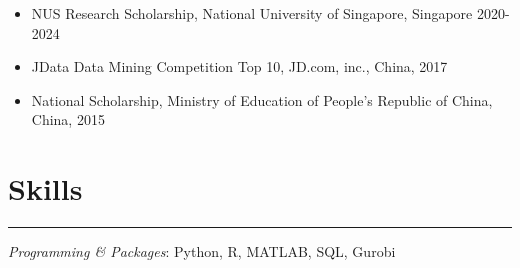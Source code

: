 \documentclass[12pt, a4paper]{article}
\begin{document}
{\begin{itemize}[leftmargin=26pt, itemsep=1pt, parsep=0.5pt, topsep=1pt]
	\item NUS Research Scholarship, National University of Singapore, Singapore \hfill 2020-2024
	
	\item JData Data Mining Competition Top 10, JD.com, inc., China, 2017

	\item National Scholarship, Ministry of Education of People’s Republic of China, China, 2015


\end{itemize}




\section*{Skills}
\vspace*{0.4em}
\hrule height 0.5pt

\textit{Programming \& Packages}: Python, R, MATLAB, SQL, Gurobi


}

\end{document}
